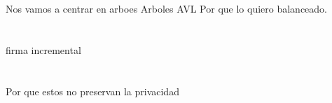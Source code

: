 \documentclass[10pt,handout]{beamer}
\begin{document}
\section{}
\begin{frame}
\frametitle{}
Nos vamos a centrar en arboes
Arboles AVL
Por que lo quiero balanceado.
\end{frame}

\section{}
\begin{frame}
\frametitle{}
firma incremental

\end{frame}


\section{}
\begin{frame}
\frametitle{}
Por que estos no preservan la privacidad

\end{frame}
\end{document}
